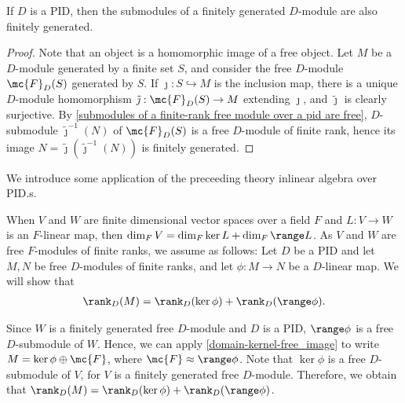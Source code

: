 \begin{cor}
    If $D$ is a PID, then the submodules of a finitely generated $D$-module are also finitely generated.
\end{cor}
\begin{proof}
    Note that an object is a homomorphic image of a free object.
    \ifinclude
    Let $M$ be a $D$-module generated by a finite set $S$, and consider the free $D$-module $\mc{F}_D(S)$ generated by $S$.
    If $\jmath: S\hookrightarrow M$ is the inclusion map, there is a unique $D$-module homomorphism $\tilde\jmath: \mc{F}_D(S)\rightarrow M$ extending $\jmath$, and $\tilde\jmath$ is clearly surjective.
    By \cref{submodules of a finite-rank free module over a pid are free}, $D$-submodule $\tilde\jmath^{-1}(N)$ of $\mc{F}_D(S)$ is a free $D$-module of finite rank, hence its image $N=\tilde\jmath(\tilde\jmath^{-1}(N))$ is finitely generated.
    \else
    \fi
\end{proof}
We introduce some application of the preceeding theory inlinear algebra over PID.s.
\begin{exmp}
    When $V$ and $W$ are finite dimensional vector spaces over a field $F$ and $L: V\rightarrow W$ is an $F$-linear map, then $\dim_F V=\dim_F\ker L+\dim_F\range L$.
    As $V$ and $W$ are free $F$-modules of finite ranks, we assume as follows: Let $D$ be a PID and let $M, N$ be free $D$-modules of finite ranks, and let $\phi: M\rightarrow N$ be a $D$-linear map.
    We will show that
    \begin{align*}
        \rank_D(M)=\rank_D(\ker\phi)+\rank_D(\range\phi).
    \end{align*}

    Since $W$ is a finitely generated free $D$-module and $D$ is a PID, $\range\phi$ is a free $D$-submodule of $W$.
    Hence, we can apply \cref{domain-kernel-free_image} to write $M=\ker\phi\oplus\mc{F}$, where $\mc{F}\approx\range\phi$.
    Note that $\ker\phi$ is a free $D$-submodule of $V$, for $V$ is a finitely generated free $D$-module.
    Therefore, we obtain that $\rank_D(M)=\rank_D(\ker\phi)+\rank_D(\range\phi)$.
\end{exmp}
